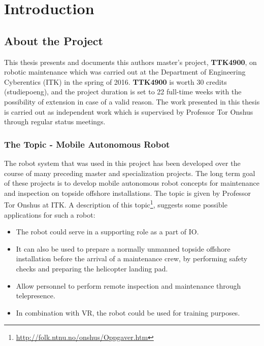 \chapter{Introduction}
\label{chp:introduction} 

\section{About the Project}

This thesis presents and documents this authors master's project, \textbf{TTK4900}, on robotic maintenance which was carried out at the Department of Engineering Cyberentics (ITK) in the spring of 2016. \textbf{TTK4900} is worth 30 credits (studiepoeng), and the project duration is set to 22 full-time weeks with the possibility of extension in case of a valid reason. The work presented in this thesis is carried out as independent work which is supervised by Professor Tor Onshus through regular status meetings.


\subsection{The Topic - Mobile Autonomous Robot}

The robot system that was used in this project has been developed over the course of many preceding master and specialization projects. The long term goal of these projects is to develop mobile autonomous robot concepts for maintenance and inspection on topside offshore installations. The topic is given by Professor Tor Onshus at \ac{ITK}. A description of this topic\footnote{\url{http://folk.ntnu.no/onshus/Oppgaver.htm}}, suggests some possible applications for such a robot: 

\begin{itemize}
	\item The robot could serve in a supporting role as a part of \ac{IO}.
	\item It can also be used to prepare a normally unmanned topside offshore installation before the arrival of a maintenance crew, by performing safety checks and preparing the helicopter landing pad.  
	\item Allow personnel to perform remote inspection and maintenance through telepresence.
	\item  In combination with \ac{VR}, the robot could be used for training purposes. 
\end{itemize}

